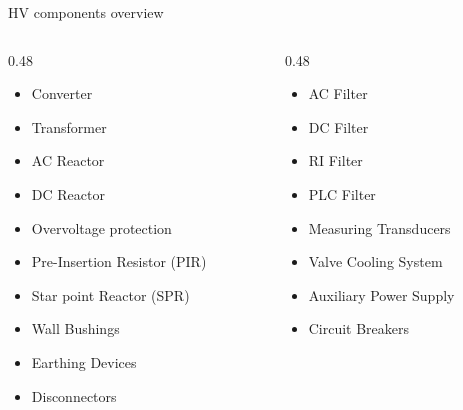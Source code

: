 
\newcommand{\cfig}[1]{chapters/terminal/components/figures/#1}

\begin{frame}{HV components overview}
  \begin{columns}[T,onlytextwidth]
    \begin{column}{0.48\textwidth}
      \begin{itemize}
        \setlength{\itemsep}{0.5em}
        \item Converter
        \item Transformer
        \item AC Reactor
        \item DC Reactor
        \item Overvoltage protection
        \item Pre-Insertion Resistor (PIR)
        \item Star point Reactor (SPR)
        \item Wall Bushings
        \item Earthing Devices
        \item Disconnectors
      \end{itemize}
    \end{column}
    \begin{column}{0.48\textwidth}
      \begin{itemize}
        \setlength{\itemsep}{0.5em}
        \item AC Filter
        \item DC Filter
        \item RI Filter
        \item PLC Filter
        \item Measuring Transducers
        \item Valve Cooling System
        \item Auxiliary Power Supply
        \item Circuit Breakers
      \end{itemize}
    \end{column}
  \end{columns}
\end{frame}



% 
% 
% 
% 
